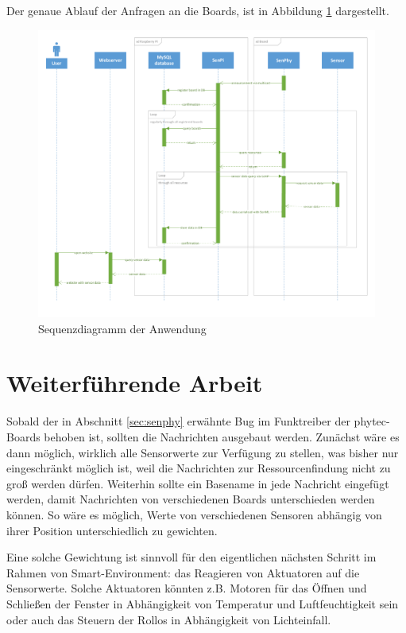 \documentclass[a4paper]{article}
\begin{document}
Der genaue Ablauf der Anfragen an die Boards, ist in Abbildung \ref{fig:seq_diagram} 
dargestellt.
\begin{figure}[h]
\centering
\includegraphics[scale=0.5]{sequenceDiagram.pdf}
\caption{\label{fig:seq_diagram}Sequenzdiagramm der Anwendung}
\end{figure}

\section{Weiterführende Arbeit}
Sobald der in Abschnitt \ref{sec:senphy} erwähnte Bug im Funktreiber der phytec-Boards behoben ist, sollten die Nachrichten ausgebaut werden. Zunächst wäre es dann möglich, wirklich alle Sensorwerte zur Verfügung zu stellen, was bisher nur eingeschränkt möglich ist, weil die Nachrichten zur Ressourcenfindung nicht zu groß werden dürfen. Weiterhin sollte ein Basename in jede Nachricht eingefügt werden, damit Nachrichten von verschiedenen Boards unterschieden werden können. So wäre es möglich, Werte von verschiedenen Sensoren abhängig von ihrer Position unterschiedlich zu gewichten.

Eine solche Gewichtung ist sinnvoll für den eigentlichen nächsten Schritt im Rahmen von Smart-Environment: das Reagieren von Aktuatoren auf die Sensorwerte. Solche Aktuatoren könnten z.B. Motoren für das Öffnen und Schließen der Fenster in Abhängigkeit von Temperatur und Luftfeuchtigkeit sein oder auch das Steuern der Rollos in Abhängigkeit von Lichteinfall.
\end{document}
